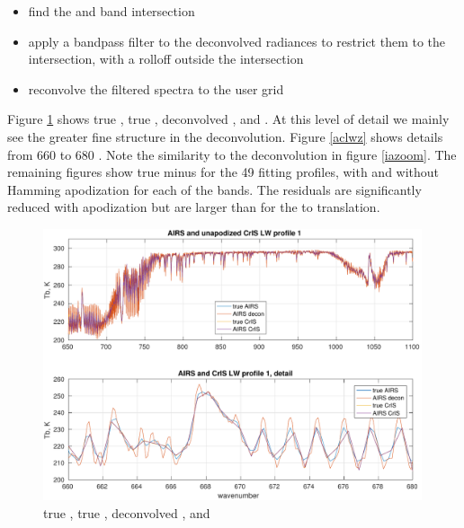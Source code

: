 \documentclass[12pt]{article}
\begin{document}
\begin{itemize}
  \item find the {\airs} and {\cris} band intersection

  \item apply a bandpass filter to the deconvolved {\airs} radiances
    to restrict them to the intersection, with a rolloff outside the
    intersection

  \item reconvolve the filtered spectra to the {\cris} user grid

\end{itemize}

Figure \ref{aclws} shows true {\cris}, true {\airs}, deconvolved
{\airs}, and {\airs} {\cris}.  At this level of detail we mainly see
the greater fine structure in the deconvolution.  Figure \ref{aclwz}
shows details from 660 to 680 {\wn}.  Note the similarity to the
{\iasi} deconvolution in figure \ref{iazoom}.  The remaining figures
show true {\cris} minus {\airs} {\cris} for the 49 fitting profiles,
with and without Hamming apodization for each of the {\cris} bands.
The residuals are significantly reduced with apodization but are
larger than for the {\iasi} to {\cris} translation.

\begin{figure}
  \centering
  \includegraphics[height=8cm]{figures/a2cris_spec_LW.pdf}
  \caption{true {\cris}, true {\airs}, deconvolved {\airs}, and
    {\airs} {\cris} }
  \label{aclws}
\end{figure}
\end{document}
